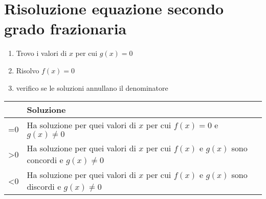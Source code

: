 \section{Risoluzione equazione secondo grado frazionaria}
\begin{enumerate}
	\item Trovo i valori di $x$ per cui $g(x)=0$
	\item Risolvo $f(x)=0$ 
	\item verifico se le soluzioni annullano il denominatore 
\end{enumerate}
\begin{center}
	\begin{tabular}{Cp{0.4\textwidth}}
\toprule
	& Soluzione \\ 
\midrule
{}=0	& Ha soluzione per quei valori di $x$ per cui $f(x)=0$ e $g(x)\neq 0$  \\ 
>0	& Ha soluzione per quei valori di $x$ per cui $f(x)$ e $g(x)$ sono concordi e $g(x)\neq 0$  \\ 
<0	& Ha soluzione per quei valori di $x$ per cui $f(x)$ e $g(x)$ sono discordi e $g(x)\neq 0$  \\ 
\bottomrule
\end{tabular}
\end{center}